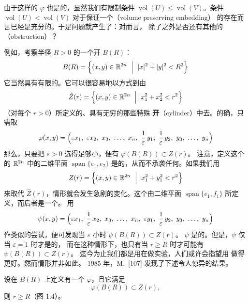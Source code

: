 由于这样的 $\varphi$ 也是\trVolumePreserving{}的，显然我们有限制条件%
$\operatorname{vol}(U)\leq\operatorname{vol}(V)$。条件 $\operatorname{vol}(U)<\operatorname{vol}(V)$%
对于保证一个\textbf{\trVolumePreserving\trEmbedding}（volume preserving embedding）%
的存在而言已经是充分的。于是问题就产生了：对\trSymplecticEmbedding{}而言，%
除了\trVolume{}之外是否还有其他的\textbf{\trObstruction}（obstruction）？

例如，考察半径 $R>0$ 的一个开\trBall{} $B(R)$：
\[
B(R)=\Bigl\{(x,y)\in\R^{2n}\ \Bigm|\ |x|^{2}+|y|^{2}<R^{2}\Bigr\}
\]
它当然具有有限的\trVolume。它可以很容易地以\trSymplectic{}方式\trEmbedding{}到由
\[
\hat{Z}(r)=\Bigl\{(x,y)\in\R^{2n}\ \Bigm|\ x_{1}^{2}+x_{2}^{2}<r^{2}\Bigr\}
\]
（对每个 $r>0$）所定义的、具有无穷\trVolume{}的那些特殊%
\textbf{开\trCylinder}（cylinder）中去。的确，只需取\trLinear\trSymplecticMapping
\[
\varphi(x,y)=\Bigl(\varepsilon x_{1},\ \varepsilon x_{2},\ x_{3},\ \dots,\ x_{n},\
\frac{1}{\varepsilon}\,y_{1},\ \frac{1}{\varepsilon}\,y_{2},\ y_{3},\ \dots,\ y_{n}\Bigr)
\]
那么，只要把 $\varepsilon>0$ 选得足够小，便有 $\varphi(B(R))\subset\hat{Z}(r)$。%
注意，定义这个\trCylinder{}的 $\mathbb{R}^{2n}$ 中的二维平面 $\operatorname{span}\{e_{1},e_{2}\}$%
是\trIsotropic{}的，从而不承袭任何\trSymplecticStructure。如果我们用\trCylinder
\[
Z(r)=\Bigl\{(x,y)\in\R^{2n}\ \Bigm|\ x_{1}^{2}+y_{1}^{2}<r^{2}\Bigr\}
\]
来取代 $\hat{Z}(r)$，情形就会发生急剧的变化。这个\trCylinder{}由二维平面%
$\operatorname{span}\{e_{1},f_{1}\}$ 所定义，而后者是一个\trSymplectic\trSubspace。%
用\trMapping
\[
\psi(x,y)=\Bigl(\varepsilon x_{1},\ \frac{1}{\varepsilon}\,x_{2},\ x_{3},\ \dots,\ x_{n},\
\varepsilon y_{1},\ \frac{1}{\varepsilon}\,y_{2},\ y_{3},\ \dots,\ y_{n}\Bigr)
\]
作类似的尝试，便可发现当 $\varepsilon$ 小时 $\psi(B(R))\subset Z(r)$。%
\trMapping{} $\psi$ 是\trVolumePreserving{}的。但是，$\psi$ 仅当 $\varepsilon=1$ 时才是\trSymplectic{}的，%
而在这种情形下，也只有当 $r\geq R$ 时才可能有 $\psi(B(R))\subset Z(r)$。%
迄今为止我们都是用\trLinear\trSymplecticMapping{}在做实验，人们或许会指望用%
\trNonlinear\trSymplecticMapping{}做得更好。然而情形并非如此。%
1985 年，M.~\trGromov{}[107] 发现了下述令人惊异的结果。

\begin{theorem}[\trGromov\trSqueezingTheorem]\label{thm:gromov-squeezing}
设在 $B(R)$ 上定义有一个\trSymplecticEmbedding{} $\varphi$，且它满足
\[
\varphi(B(R))\subset Z(r),
\]
则 $r\geq R$（图 1.4）。
\end{theorem}

